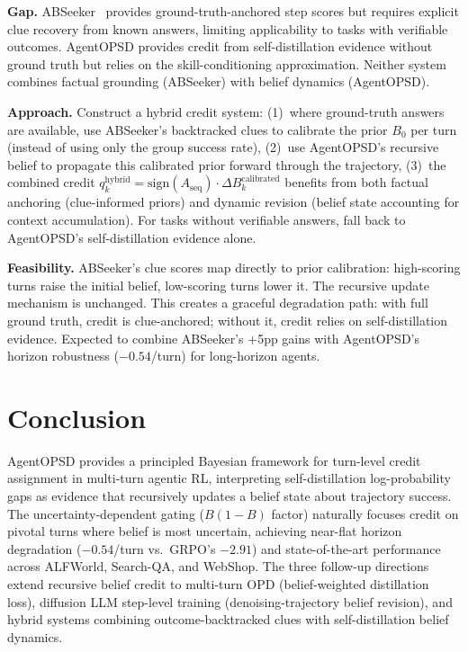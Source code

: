 \documentclass[11pt,a4paper]{article}
\begin{document}
\textbf{Gap.} ABSeeker~\cite{abseeker2026} provides ground-truth-anchored step scores but requires explicit clue recovery from known answers, limiting applicability to tasks with verifiable outcomes. AgentOPSD provides credit from self-distillation evidence without ground truth but relies on the skill-conditioning approximation. Neither system combines factual grounding (ABSeeker) with belief dynamics (AgentOPSD).

\textbf{Approach.} Construct a hybrid credit system: (1)~where ground-truth answers are available, use ABSeeker's backtracked clues to calibrate the prior $B_0$ per turn (instead of using only the group success rate), (2)~use AgentOPSD's recursive belief to propagate this calibrated prior forward through the trajectory, (3)~the combined credit $q_k^{\text{hybrid}} = \text{sign}(A_{\text{seq}}) \cdot \Delta B_k^{\text{calibrated}}$ benefits from both factual anchoring (clue-informed priors) and dynamic revision (belief state accounting for context accumulation). For tasks without verifiable answers, fall back to AgentOPSD's self-distillation evidence alone.

\textbf{Feasibility.} ABSeeker's clue scores map directly to prior calibration: high-scoring turns raise the initial belief, low-scoring turns lower it. The recursive update mechanism is unchanged. This creates a graceful degradation path: with full ground truth, credit is clue-anchored; without it, credit relies on self-distillation evidence. Expected to combine ABSeeker's +5pp gains with AgentOPSD's horizon robustness ($-0.54$/turn) for long-horizon agents.

\section{Conclusion}
AgentOPSD provides a principled Bayesian framework for turn-level credit assignment in multi-turn agentic RL, interpreting self-distillation log-probability gaps as evidence that recursively updates a belief state about trajectory success. The uncertainty-dependent gating ($B(1-B)$ factor) naturally focuses credit on pivotal turns where belief is most uncertain, achieving near-flat horizon degradation ($-0.54$/turn vs.\ GRPO's $-2.91$) and state-of-the-art performance across ALFWorld, Search-QA, and WebShop. The three follow-up directions extend recursive belief credit to multi-turn OPD (belief-weighted distillation loss), diffusion LLM step-level training (denoising-trajectory belief revision), and hybrid systems combining outcome-backtracked clues with self-distillation belief dynamics.
\end{document}
